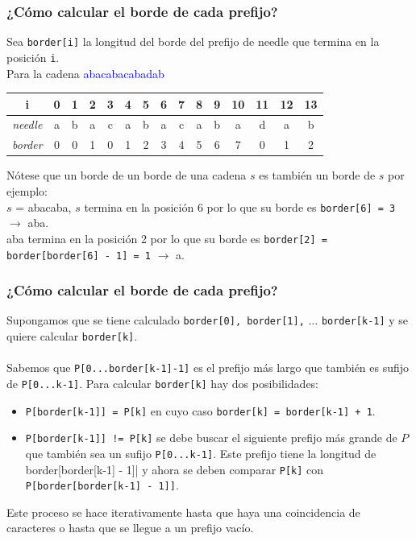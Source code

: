 \documentclass{beamer}
\begin{document}
	\begin{frame}[fragile]
		\frametitle{¿Cómo calcular el borde de cada prefijo?}
		Sea \verb|border[i]| la longitud del borde del prefijo de needle que termina en la posición \verb|i|.\\
		Para la cadena \textcolor{blue}{abacabacabadab}
		\begin{center}
		  \begin{tabular}{| c | c c c c c c c c c c c c c c | }
		    \hline
		    i & 0 & 1 & 2 & 3 & 4 & 5 & 6 & 7 & 8 & 9 & 10 & 11 & 12 & 13 \\ %
		    \hline
		    \hline
		    \textit{needle} & a & b & a & c & a & b & a & c & a & b & a & d & a & b \\
		    \textit{border} & 0 & 0 & 1 & 0 & 1 & 2 & 3 & 4 & 5 & 6 & 7 & 0 & 1 & 2 \\
		    \hline
		  \end{tabular}
		\end{center}
		Nótese que un borde de un borde de una cadena $s$ es también un borde de $s$ por ejemplo:\\
		$s$ = abacaba, $s$ termina en la posición 6 por lo que su borde es \verb|border[6] = 3| $\rightarrow$ aba.\\
		aba termina en la posición 2 por lo que su borde es \verb|border[2] = border[border[6] - 1] = 1| $\rightarrow$ a.
	\end{frame}
	
	\begin{frame}[fragile]
		\frametitle{¿Cómo calcular el borde de cada prefijo?}
		Supongamos que se tiene calculado \verb|border[0], border[1],| $\ldots$ \verb|border[k-1]| y se quiere calcular \verb|border[k]|.\\ \quad \\
		Sabemos que \verb|P[0...border[k-1]-1]| es el prefijo más largo que también es sufijo de \verb|P[0...k-1]|. Para calcular \verb|border[k]| hay dos posibilidades:
		\begin{itemize}
			\item \verb|P[border[k-1]] = P[k]| en cuyo caso \verb|border[k] = border[k-1] + 1|.
			\item \verb|P[border[k-1]] != P[k]| se debe buscar el siguiente prefijo más grande de $P$ que también sea un sufijo \verb|P[0...k-1]|. Este prefijo tiene la longitud de border[border[k-1] - 1]| y ahora se deben comparar \verb|P[k]| con \verb|P[border[border[k-1] - 1]]|.
		\end{itemize}
		Este proceso se hace iterativamente hasta que haya una coincidencia de caracteres o hasta que se llegue a un prefijo vacío.
	\end{frame}
	
\end{document}
